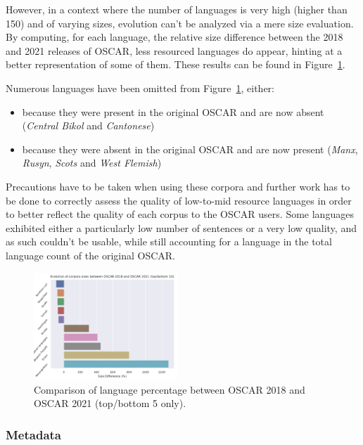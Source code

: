 However, in a context where the number of languages is very high (higher than 150) and of varying sizes, evolution can't be analyzed via a mere size evaluation. By computing, for each language, the relative size difference between the 2018 and 2021 releases of OSCAR, less resourced languages do appear, hinting at a better representation of some of them. These results can be found in Figure~\ref{fig:lang-size-pctg}.

Numerous languages have been omitted from Figure~\ref{fig:lang-size-pctg}, either:
\begin{itemize}
    \item because they were present in the original OSCAR and are now absent (\textit{Central Bikol} and \textit{Cantonese})
    \item because they were absent in the original OSCAR and are now present (\textit{Manx}, \textit{Rusyn}, \textit{Scots} and \textit{West Flemish})
\end{itemize}

Precautions have to be taken when using these corpora and further work has to be done to correctly assess the quality of low-to-mid resource languages in order to better reflect the quality of each corpus to the OSCAR users. Some languages exhibited either a particularly low number of sentences or a very low quality, and as such couldn't be usable, while still accounting for a language in the total language count of the original OSCAR.

\begin{figure}[ht]
    \includegraphics[width=0.48\textwidth, angle=0]{static/media/oscar/ungoliant/size_evo_pctg}
    \caption{Comparison of language percentage between OSCAR 2018 and OSCAR 2021 (top/bottom 5 only).}
    \label{fig:lang-size-pctg}
\end{figure}

\subsubsection{Metadata}

